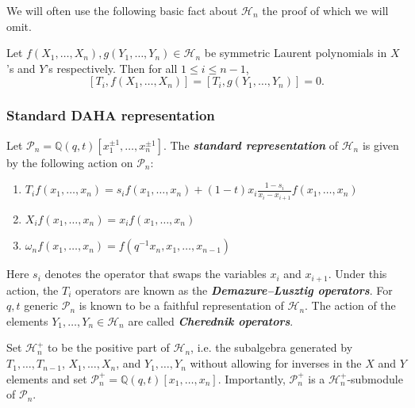 \documentclass[ALCO,Unicode]{cedram}
\begin{document}
We will often use the following basic fact about $\mathscr{H}_n$ the proof of which we will omit. 

\begin{lemm} \label{sym x and y commute with T's}
    Let $f(X_1,\ldots,X_n), g(Y_1,\ldots, Y_n) \in \mathscr{H}_n$ be symmetric Laurent polynomials in $X$'s and $Y$'s respectively. Then for all $1 \leq i \leq n-1$, 
    $$[T_i,f(X_1,\ldots,X_n)] = [T_i,g(Y_1,\ldots, Y_n)] = 0.$$
\end{lemm}





\subsubsection{Standard DAHA representation}
\begin{defi} \label{defn2}
Let $\mathscr{P}_n = \mathbb{Q}(q,t)[x_1^{\pm 1},\ldots,x_n^{\pm 1}]$. The \textbf{\textit{ standard representation}} of $\mathscr{H}_n$ is given by the following action on $\mathscr{P}_n$:

\begin{center}
\begin{enumerate}
    \item $T_if(x_1,\ldots,x_n) = s_i f(x_1,\ldots,x_n) +(1-t)x_i \frac{1-s_i}{x_i-x_{i+1}}f(x_1,\ldots,x_n)$
    \item $X_if(x_1,\ldots,x_n)= x_if(x_1,\ldots,x_n)$
    \item $\omega_nf(x_1,\ldots,x_n) = f(q^{-1}x_n,x_1,\ldots,x_{n-1})$
\end{enumerate}
\end{center}

Here $s_i$ denotes the operator that swaps the variables $x_i$ and $x_{i+1}$. Under this action, the $T_i$ operators are known as the \textbf{\textit{Demazure--Lusztig operators}}. For $q,t$ generic $\mathscr{P}_n$ is known to be a faithful representation of $\mathscr{H}_n$. The action of the elements $Y_1,\ldots,Y_n \in \mathscr{H}_n$ are called \textbf{\textit{Cherednik operators}}.
\end{defi}

Set $\mathscr{H}_n^{+}$ to be the positive part of $\mathscr{H}_n$, i.e. the subalgebra generated by $T_1,\ldots,T_{n-1}$, $X_1,\ldots,X_n$, and $Y_1,\ldots,Y_n$ without allowing for inverses in the $X$ and $Y$ elements and set $\mathscr{P}_n^{+} = \mathbb{Q}(q,t)[x_1,\ldots,x_n]$. Importantly, 
$\mathscr{P}_n^{+}$ is a $\mathscr{H}_n^{+}$-submodule of $\mathscr{P}_n$. 
\end{document}
